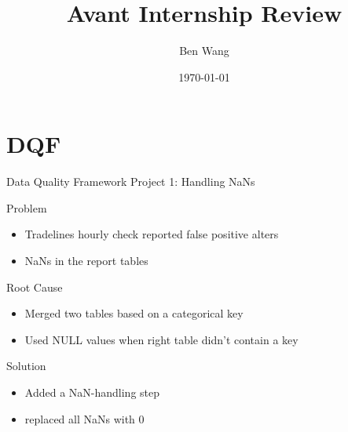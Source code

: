 \documentclass{beamer}
\title[Avant Internship Review]{Avant Internship Review}
\author{Ben Wang}
\institute{Avant}
\date{\today}
\begin{document}
\begin{frame}
  \titlepage
\end{frame}



\section{DQF}

\begin{frame}{Data Quality Framework}
Project 1: Handling NaNs
    \begin{block}{Problem}
		\begin{itemize}
		\item Tradelines hourly check reported false positive alters 
		\item  NaNs in the report tables
		\end{itemize}
    \end{block}

    \begin{block}{Root Cause}
		\begin{itemize}
		\item Merged two tables based on a categorical key 
		\item Used NULL values when right table didn't contain a key
        \end{itemize}
    \end{block}

    \begin{block}{Solution}
		\begin{itemize}
		\item Added a NaN-handling step 
		\item replaced all NaNs with 0
		\end{itemize}
    \end{block}
\end{frame}
\end{document}

